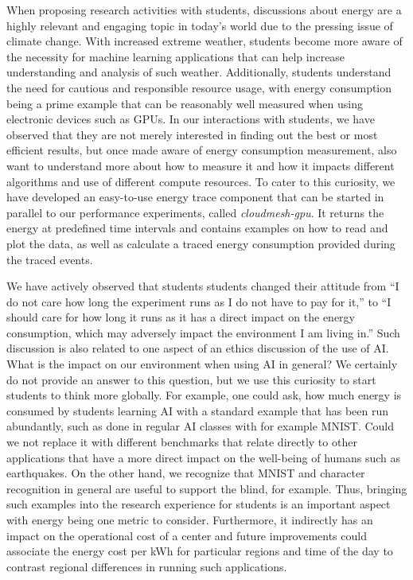\documentclass[utf8]{FrontiersinVancouver} %
\begin{document}
When proposing research activities with students, discussions about energy are a highly relevant and engaging topic in today's world due to the pressing issue of climate change. With increased extreme weather, students become more aware of the necessity for machine learning applications that can help increase understanding and analysis of such weather. Additionally, students understand the need for cautious and responsible resource usage, with energy consumption being a prime example that can be reasonably well measured when using electronic devices such as GPUs.
In our interactions with students, we have observed that they are not merely interested in finding out the best or most efficient results, but once made aware of energy consumption measurement, also want to understand more about how to measure it and how it impacts different algorithms and use of different compute resources.
To cater to this curiosity, we have developed an easy-to-use energy trace component that can be started in parallel to our performance experiments, called {\em cloudmesh-gpu}. It returns the energy at predefined time intervals and contains examples on how to read and plot the data, as well as calculate a traced energy consumption provided during the traced events.

We have actively observed that students 
students changed their attitude from ``I do not care how long the experiment runs as I do not have to pay for it,'' to ``I should care for how long it runs as it has a direct impact on the energy consumption, which may adversely impact the environment I am living in.''
Such discussion is also related to one aspect of an ethics discussion of the use of AI. What is the impact on our environment when using AI in general? We certainly do not provide an answer to this question, but we use this curiosity to start students to think more globally. For example, one could ask, how much energy is consumed by students learning AI with a standard example that has been run abundantly, such as done in regular AI classes with for example MNIST. Could we not replace it with different benchmarks that relate directly to other applications that have a more direct impact on the well-being of humans such as earthquakes. On the other hand, we recognize that MNIST and character recognition in general are useful to support the blind, for example. Thus, bringing such examples into the research experience for students is an important aspect with energy being one metric to consider. Furthermore, it indirectly has an impact on the operational cost of a center and future improvements could associate the energy cost per kWh for particular regions and time of the day to contrast regional differences in running such applications.
 
\end{document}
